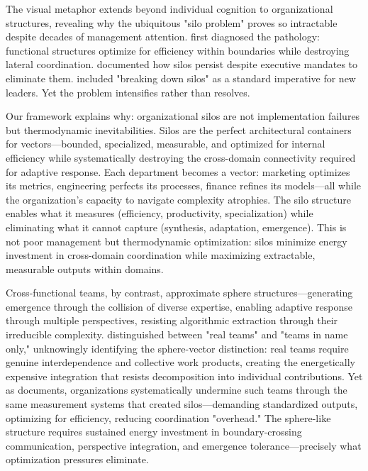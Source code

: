 The visual metaphor extends beyond individual cognition to organizational structures, revealing why the ubiquitous "silo problem" proves so intractable despite decades of management attention. \citet{galbraith1973} first diagnosed the pathology: functional structures optimize for efficiency within boundaries while destroying lateral coordination. \citet{aaker2008} documented how silos persist despite executive mandates to eliminate them. \citet{watkins2013} included "breaking down silos" as a standard imperative for new leaders. Yet the problem intensifies rather than resolves.

Our framework explains why: organizational silos are not implementation failures but thermodynamic inevitabilities. Silos are the perfect architectural containers for vectors—bounded, specialized, measurable, and optimized for internal efficiency while systematically destroying the cross-domain connectivity required for adaptive response. Each department becomes a vector: marketing optimizes its metrics, engineering perfects its processes, finance refines its models—all while the organization's capacity to navigate complexity atrophies. The silo structure enables what it measures (efficiency, productivity, specialization) while eliminating what it cannot capture (synthesis, adaptation, emergence). This is not poor management but thermodynamic optimization: silos minimize energy investment in cross-domain coordination while maximizing extractable, measurable outputs within domains.

Cross-functional teams, by contrast, approximate sphere structures—generating emergence through the collision of diverse expertise, enabling adaptive response through multiple perspectives, resisting algorithmic extraction through their irreducible complexity. \citet{hackman2002} distinguished between "real teams" and "teams in name only," unknowingly identifying the sphere-vector distinction: real teams require genuine interdependence and collective work products, creating the energetically expensive integration that resists decomposition into individual contributions. Yet as \citet{edmondson2012} documents, organizations systematically undermine such teams through the same measurement systems that created silos—demanding standardized outputs, optimizing for efficiency, reducing coordination "overhead." The sphere-like structure requires sustained energy investment in boundary-crossing communication, perspective integration, and emergence tolerance—precisely what optimization pressures eliminate.

